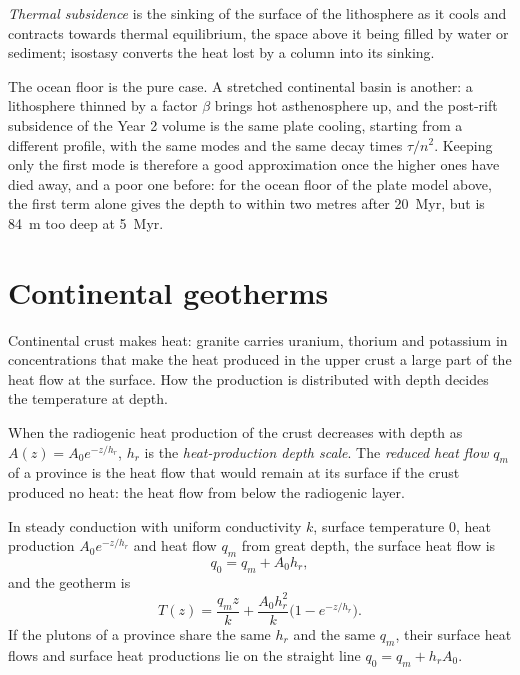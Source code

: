 \begin{definition}\label{def:b3:lithosphere-thermal-models:thermal-subsidence}
\emph{Thermal subsidence} is the sinking of the
surface of the lithosphere as it cools and contracts towards thermal
equilibrium, the space above it being filled by water or sediment; isostasy
converts the heat lost by a column into its sinking.
\end{definition}

The ocean floor is the pure case. A stretched continental basin is another: a
lithosphere thinned by a factor $\beta$ brings hot asthenosphere up, and the
post-rift subsidence of the Year 2 volume is the same plate cooling, starting
from a different profile, with the same modes and the same decay times $\tau/n^2$.
Keeping only the first mode is therefore a good approximation once the higher
ones have died away, and a poor one before: for the ocean floor of the plate
model above, the first term alone gives the depth to within two metres after
\qty{20}{Myr}, but is \qty{84}{m} too deep at \qty{5}{Myr}.

\section{Continental geotherms}

Continental crust makes heat: granite carries uranium, thorium and potassium in
concentrations that make the heat produced in the upper crust a large part of
the heat flow at the surface. How the production is distributed with depth
decides the temperature at depth.

\begin{definition}\label{def:b3:lithosphere-thermal-models:reduced}
When the radiogenic heat production of the crust decreases with depth as
$A(z) = A_0e^{-z/h_r}$, $h_r$ is the \emph{heat-production depth
scale}. The \emph{reduced heat
flow} $q_m$ of a province is the heat flow that would
remain at its surface if the crust produced no heat: the heat flow from below
the radiogenic layer.
\end{definition}

\begin{proposition}\label{prop:b3:lithosphere-thermal-models:exponential}
In steady conduction with uniform conductivity $k$, surface temperature $0$,
heat production $A_0e^{-z/h_r}$ and heat flow $q_m$ from great depth, the
surface heat flow is
\[
  q_0 = q_m + A_0h_r,
\]
and the geotherm is
\[
  T(z) = \frac{q_mz}{k} + \frac{A_0h_r^2}{k}\bigl(1 - e^{-z/h_r}\bigr).
\]
If the plutons of a province share the same $h_r$ and the same $q_m$, their
surface heat flows and surface heat productions lie on the straight line
$q_0 = q_m + h_rA_0$.
\end{proposition}

